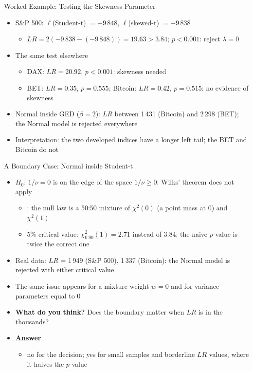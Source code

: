 \begin{frame}{Worked Example: Testing the Skewness Parameter}
\itemsize{\small}
\begin{itemize}
    \item S\&P 500: $\ell$(Student-t) $= -9\,848$, $\ell$(skewed-t) $= -9\,838$
    \begin{itemize}
        \item $LR = 2(-9\,838 - (-9\,848)) = 19.63 > 3.84$; $p <0.001$: reject $\lambda = 0$
    \end{itemize}
    \item The same test elsewhere
    \begin{itemize}
        \item DAX: $LR = 20.92$, $p <0.001$: skewness needed
        \item BET: $LR = 0.35$, $p = 0.555$; Bitcoin: $LR = 0.42$, $p = 0.515$: no evidence of skewness
    \end{itemize}
    \item Normal inside GED ($\beta = 2$): $LR$ between 1\,431 (Bitcoin) and 2\,298 (BET); the Normal model is rejected everywhere
    \item Interpretation: the two developed indices have a longer left tail; the BET and Bitcoin do not
\end{itemize}
\end{frame}

\begin{frame}{A Boundary Case: Normal inside Student-t}
\itemsize{\small}
\begin{itemize}
    \item $H_0$: $1/\nu = 0$ is on the edge of the space $1/\nu \ge 0$: Wilks' theorem does not apply
    \begin{itemize}
        \item {}: the null law is a 50:50 mixture of $\chi^2(0)$ (a point mass at 0) and $\chi^2(1)$
        \item 5\% critical value: $\chi^2_{0.90}(1) = 2.71$ instead of $3.84$; the naive $p$-value is twice the correct one
    \end{itemize}
    \item Real data: $LR$ = 1\,949 (S\&P 500), 1\,337 (Bitcoin): the Normal model is rejected with either critical value
    \item The same issue appears for a mixture weight $w = 0$ and for variance parameters equal to 0
    \item \textbf{What do you think?} Does the boundary matter when $LR$ is in the thousands?
    \item \textbf{Answer}
    \begin{itemize}
        \item no for the decision; yes for small samples and borderline $LR$ values, where it halves the $p$-value
    \end{itemize}
\end{itemize}
\end{frame}

